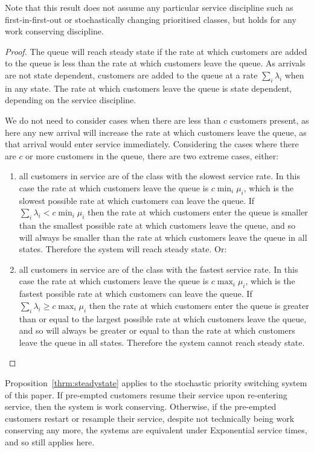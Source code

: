 \documentclass{article}
\begin{document}
Note that this result does not assume any particular service discipline such as
first-in-first-out or stochastically changing prioritised classes, but holds for
any work conserving discipline.

\begin{proof}
The queue will reach steady state if the rate at which customers are added to
the queue is less than the rate at which customers leave the queue.
As arrivals are not state dependent, customers are added to the queue at a rate
$\sum_i \lambda_i$ when in any state.
The rate at which customers leave the queue is state dependent, depending on the
service discipline.

We do not need to consider cases when there are less than $c$ customers present,
as here any new arrival will increase the rate at which customers leave the
queue, as that arrival would enter service immediately.
Considering the cases where there are $c$ or more customers in the queue, there
are two extreme cases, either:

\begin{enumerate}
  \item all customers in service are of the class with the slowest service rate.
  In this case the rate at which customers leave the queue is $c \min_i \mu_i$,
  which is the slowest possible rate at which customers can leave the queue.
  If $\sum_i \lambda_i < c \min_i \mu_i$ then the rate at which customers enter
  the queue is smaller than the smallest possible rate at which customers leave
  the queue, and so will always be smaller than the rate at which customers
  leave the queue in all states. Therefore the system will reach steady state.
  Or:
  \item all customers in service are of the class with the fastest service rate.
  In this case the rate at which customers leave the queue is $c \max_i \mu_i$,
  which is the fastest possible rate at which customers can leave the queue.
  If $\sum_i \lambda_i \geq c \max_i \mu_i$ then the rate at which customers
  enter the queue is greater than or equal to the largest possible rate at which
  customers leave the queue, and so will always be greater or equal to than the
  rate at which customers leave the queue in all states. Therefore the system
  cannot reach steady state.
\end{enumerate}
\end{proof}

Proposition~\ref{thrm:steadystate} applies to the stochastic priority switching
system of this paper. If pre-empted customers resume their service upon
re-entering service, then the system is work conserving. Otherwise, if the
pre-empted customers restart or resample their service, despite not technically
being work conserving any more, the systems are equivalent under Exponential
service times, and so still applies here.
\end{document}
